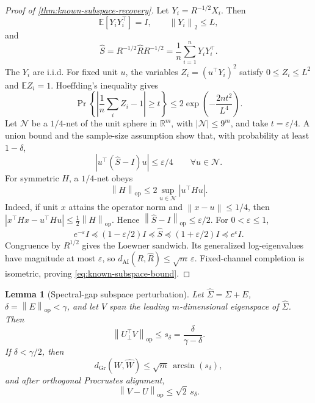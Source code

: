 \documentclass[10pt]{article}
\theoremstyle{plain}
\newtheorem{lemma}[theorem]{Lemma}
\theoremstyle{definition}
\theoremstyle{remark}
\newcommand{\R}{\mathbb R}
\newcommand{\E}{\mathbb E}
\newcommand{\AI}{\mathrm{AI}}
\newcommand{\Gr}{\mathrm{Gr}}
\newcommand{\opnorm}[1]{\left\lVert #1\right\rVert_{\operatorname{op}}}
\newcommand{\norm}[1]{\left\lVert #1\right\rVert}
\newcommand{\dai}{d_{\AI}}
\newcommand{\dgr}{d_{\Gr}}
\newcommand{\Rhat}{\widehat R}
\newcommand{\Sigmahat}{\widehat\Sigma}
\begin{document}
\begin{proof}[Proof of \cref{thm:known-subspace-recovery}]
Let \(Y_i=R^{-1/2}X_i\).  Then
\[
  \E[Y_iY_i^\top]=I,
  \qquad
  \norm{Y_i}_2\le L,
\]
and
\[
  \widehat S=R^{-1/2}\Rhat R^{-1/2}
  =\frac1n\sum_{i=1}^nY_iY_i^\top.
\]
The \(Y_i\) are i.i.d.  For fixed unit \(u\), the variables
\(Z_i=(u^\top Y_i)^2\) satisfy \(0\le Z_i\le L^2\) and
\(\E Z_i=1\).  Hoeffding's inequality gives
\[
  \Pr\left\{
  \left|\frac1n\sum_iZ_i-1\right|\ge t
  \right\}
  \le2\exp\left(-\frac{2nt^2}{L^4}\right).
\]
Let \(\mathcal N\) be a \(1/4\)-net of the unit sphere in \(\R^m\), with
\(|\mathcal N|\le9^m\), and take \(t=\varepsilon/4\).  A union bound and the
sample-size assumption show that, with probability at least \(1-\delta\),
\[
  |u^\top(\widehat S-I)u|\le\varepsilon/4
  \qquad\forall u\in\mathcal N.
\]
For symmetric \(H\), a \(1/4\)-net obeys
\[
  \opnorm H\le2\sup_{u\in\mathcal N}|u^\top Hu|.
\]
Indeed, if unit \(x\) attains the operator norm and
\(\norm{x-u}\le1/4\), then
\(|x^\top Hx-u^\top Hu|\le\frac12\opnorm H\).  Hence
\(\opnorm{\widehat S-I}\le\varepsilon/2\).  For
\(0<\varepsilon\le1\),
\[
  e^{-\varepsilon}I
  \preceq(1-\varepsilon/2)I
  \preceq\widehat S
  \preceq(1+\varepsilon/2)I
  \preceq e^\varepsilon I.
\]
Congruence by \(R^{1/2}\) gives the Loewner sandwich.  Its generalized
log-eigenvalues have magnitude at most \(\varepsilon\), so
\(\dai(R,\Rhat)\le\sqrt m\,\varepsilon\).  Fixed-channel completion is
isometric, proving \eqref{eq:known-subspace-bound}.
\end{proof}

\begin{lemma}[Spectral-gap subspace perturbation]
\label{lem:spectral-subspace}
Let \(\Sigmahat=\Sigma+E\),
\(\delta=\opnorm E<\gamma\), and let \(V\) span the leading
\(m\)-dimensional eigenspace of \(\Sigmahat\).  Then
\begin{equation}
  \opnorm{U_\perp^\top V}
  \le s_\delta=\frac{\delta}{\gamma-\delta}.
  \label{eq:sin-theta}
\end{equation}
If \(\delta<\gamma/2\), then
\begin{equation}
  \dgr(W,\widehat W)
  \le\sqrt m\,\arcsin(s_\delta),
  \label{eq:grassmann-stat}
\end{equation}
and after orthogonal Procrustes alignment,
\begin{equation}
  \opnorm{V-U}\le\sqrt2\,s_\delta.
  \label{eq:frame-stat}
\end{equation}
\end{lemma}
\end{document}
